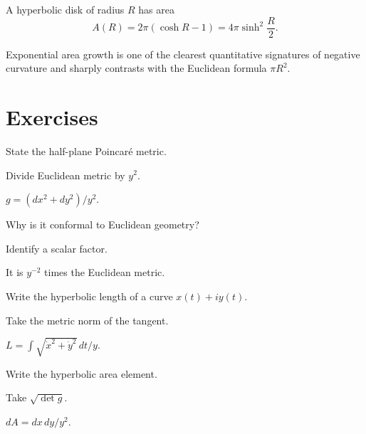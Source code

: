 A hyperbolic disk of radius \(R\) has area
\[
A(R)=2\pi(\cosh R-1)
=
4\pi\sinh^2\frac R2.
\]

\begin{remark}
Exponential area growth is one of the clearest quantitative signatures of
negative curvature and sharply contrasts with the Euclidean formula \(\pi R^2\).
\end{remark}

\section{Exercises}
\begin{exercise}\label{exr:vii32-01}
State the half-plane Poincaré metric.
\end{exercise}
\begin{hint}
Divide Euclidean metric by \(y^2\).
\end{hint}
\begin{solution}
\(g=(dx^2+dy^2)/y^2\).
\end{solution}

\begin{exercise}\label{exr:vii32-02}
Why is it conformal to Euclidean geometry?
\end{exercise}
\begin{hint}
Identify a scalar factor.
\end{hint}
\begin{solution}
It is \(y^{-2}\) times the Euclidean metric.
\end{solution}

\begin{exercise}\label{exr:vii32-03}
Write the hyperbolic length of a curve \(x(t)+iy(t)\).
\end{exercise}
\begin{hint}
Take the metric norm of the tangent.
\end{hint}
\begin{solution}
\(L=\int\sqrt{\dot x^2+\dot y^2}\,dt/y\).
\end{solution}

\begin{exercise}\label{exr:vii32-04}
Write the hyperbolic area element.
\end{exercise}
\begin{hint}
Take \(\sqrt{\det g}\).
\end{hint}
\begin{solution}
\(dA=dx\,dy/y^2\).
\end{solution}


